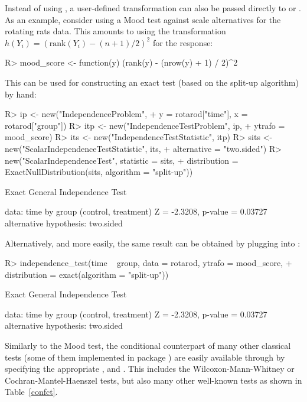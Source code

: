 \documentclass[article]{jss}
\begin{document}
Instead of using , a user-defined transformation can also be
passed directly to  or . As an example, consider
using a Mood test against scale alternatives for the rotating rats data.
This amounts to using the transformation $h(Y_i) = (\text{rank}(Y_i) - (n + 1) / 2)^2$
for the response:
\begin{Schunk}
\begin{Sinput}
R> mood_score <- function(y) (rank(y) - (nrow(y) + 1) / 2)^2
\end{Sinput}
\end{Schunk}
This can be used for constructing an exact test (based on the 
split-up algorithm) by hand:
\begin{Schunk}
\begin{Sinput}
R> ip <- new("IndependenceProblem",
+    y = rotarod["time"], x = rotarod["group"])
R> itp <- new("IndependenceTestProblem", ip, 
+    ytrafo = mood_score)
R> its <- new("IndependenceTestStatistic", itp)
R> sits <- new("ScalarIndependenceTestStatistic", its, 
+    alternative = "two.sided")
R> new("ScalarIndependenceTest", statistic = sits,
+    distribution = ExactNullDistribution(sits, algorithm = "split-up"))
\end{Sinput}
\begin{Soutput}
	Exact General Independence Test

data:  time by group (control, treatment) 
Z = -2.3208, p-value = 0.03727
alternative hypothesis: two.sided 
\end{Soutput}
\end{Schunk}
Alternatively, and more easily, the same result can be obtained by
plugging  into :
\begin{Schunk}
\begin{Sinput}
R> independence_test(time ~ group, data = rotarod, ytrafo = mood_score,
+    distribution = exact(algorithm = "split-up"))
\end{Sinput}
\begin{Soutput}
	Exact General Independence Test

data:  time by group (control, treatment) 
Z = -2.3208, p-value = 0.03727
alternative hypothesis: two.sided 
\end{Soutput}
\end{Schunk}

Similarly to the Mood test, the conditional counterpart of many
other classical tests (some of them implemented in package )
are easily available through  by specifying
the appropriate ,  and .
This includes the Wilcoxon-Mann-Whitney or Cochran-Mantel-Haenszel tests, 
but also many other well-known tests as shown in Table~\ref{confct}.
\end{document}
